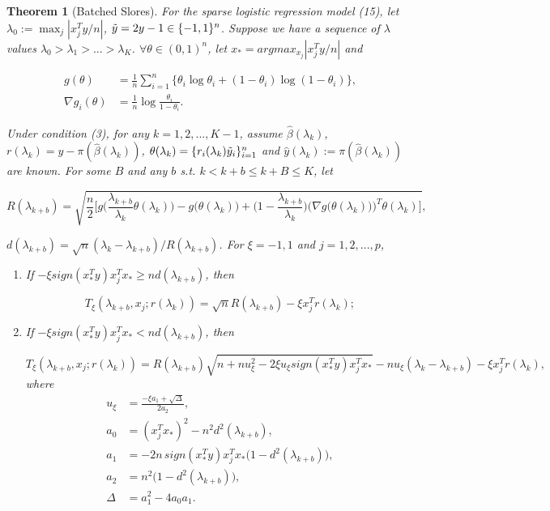 \documentclass{article}
\newtheorem{theorem}{Theorem}[section]
\begin{document}
\begin{theorem}[Batched Slores]
For the sparse logistic regression model (15), let $\lambda_0:=\max_j|x_j^Ty/n|$, $\Tilde{y}=2y-1\in\{-1,1\}^n$. Suppose we have a sequence of $\lambda$ values $\lambda_0>\lambda_1>...>\lambda_K$. $\forall\theta\in(0,1)^n$, let $x_*=argmax_{x_j}|x_j^Ty/n|$ and

\begin{equation}
    \begin{split}
        g(\theta)&=\frac{1}{n}\sum_{i=1}^n\{\theta_i\log \theta_i+(1-\theta_i)\log(1-\theta_i)\},\\
    \nabla g_i(\theta) &= \frac{1}{n}\log\frac{\theta_i}{1-\theta_i}.
    \end{split}
\end{equation}

Under condition (3), for any $k=1,2,...,K-1$, assume $\hat{\beta}(\lambda_k)$, $r(\lambda_k)=y-\pi(\hat{\beta}(\lambda_k))$, $\theta(\lambda_k)=\{r_i(\lambda_k)\Tilde{y}_i\}_{i=1}^n$ and $\hat{y}(\lambda_k):=\pi(\hat{\beta}(\lambda_k))$ are known. For some $B$ and any $b$ s.t. $k<k+b\leq k+B\leq K$, let

\begin{equation}
    R(\lambda_{k+b})=\sqrt{\frac{n}{2}\bigg[g\bigg(\frac{\lambda_{k+b}}{\lambda_k}\theta(\lambda_k)\bigg)-g\bigg(\theta(\lambda_k)\bigg)+\bigg(1-\frac{\lambda_{k+b}}{\lambda_k}\bigg)\bigg(\nabla g\big(\theta(\lambda_k)\big)\bigg)^T\theta(\lambda_k)\bigg]},
\end{equation}

$d(\lambda_{k+b})=\sqrt{n}(\lambda_k-\lambda_{k+b})/R(\lambda_{k+b})$. For $\xi = -1,1$ and $j=1,2,...,p$,

\begin{enumerate}
    \item If $-\xi sign(x_*^Ty)x_j^Tx_*\geq nd(\lambda_{k+b})$, then
    
    \begin{equation}
        T_\xi(\lambda_{k+b},x_j;r(\lambda_k))=\sqrt{n}R(\lambda_{k+b})-\xi x_j^Tr(\lambda_k);
    \end{equation}
    
    \item If $-\xi sign(x_*^Ty)x_j^Tx_*< nd(\lambda_{k+b})$, then
    
    \begin{equation}
        T_\xi(\lambda_{k+b},x_j;r(\lambda_k))=R(\lambda_{k+b})\sqrt{n+nu_\xi^2-2\xi u_\xi sign(x_*^Ty)x_j^Tx_*}-nu_\xi(\lambda_k-\lambda_{k+b})-\xi x_j^Tr(\lambda_k),
    \end{equation}
    where
    \begin{align}
        u_\xi&=\frac{-\xi a_1+\sqrt{\Delta}}{2a_2},\\
        a_0&=(x_j^Tx_*)^2-n^2d^2(\lambda_{k+b}),\nonumber\\
        a_1&=-2n\,sign(x_*^Ty)x_j^Tx_*\big(1-d^2(\lambda_{k+b})\big),\nonumber\\
        a_2&=n^2\big(1-d^2(\lambda_{k+b})\big),\nonumber\\
        \Delta&=a_1^2-4a_0a_1.\nonumber
    \end{align}
\end{enumerate}


\end{theorem}
\end{document}
